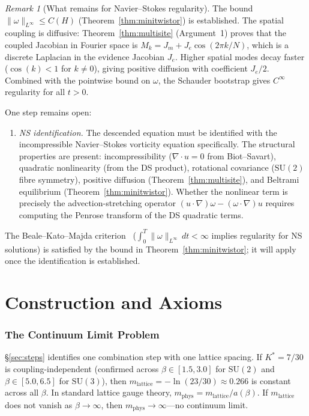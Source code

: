 \documentclass[11pt,a4paper]{article}
\theoremstyle{definition}
\theoremstyle{remark}
\newtheorem{remark}[theorem]{Remark}
\newcommand{\SU}{\mathrm{SU}}
\begin{document}
\begin{remark}[What remains for Navier--Stokes regularity]\label{rem:ns_gap}
The bound $\|\omega\|_{L^\infty}\leq C(H)$ (Theorem~\ref{thm:minitwistor}) is established. The spatial coupling is diffusive: Theorem~\ref{thm:multisite} (Argument~1) proves that the coupled Jacobian in Fourier space is $M_k=J_m+J_e\cos(2\pi k/N)$, which is a discrete Laplacian in the evidence Jacobian $J_e$. Higher spatial modes decay faster ($\cos(k)<1$ for $k\neq 0$), giving positive diffusion with coefficient $J_e/2$. Combined with the pointwise bound on $\omega$, the Schauder bootstrap gives $C^\infty$ regularity for all $t>0$.

One step remains open:
\begin{enumerate}
\item \emph{NS identification.} The descended equation must be identified with the incompressible Navier--Stokes vorticity equation specifically. The structural properties are present: incompressibility ($\nabla\cdot u=0$ from Biot--Savart), quadratic nonlinearity (from the DS product), rotational covariance ($\SU(2)$ fibre symmetry), positive diffusion (Theorem~\ref{thm:multisite}), and Beltrami equilibrium (Theorem~\ref{thm:minitwistor}). Whether the nonlinear term is precisely the advection-stretching operator $(u\cdot\nabla)\omega-(\omega\cdot\nabla)u$ requires computing the Penrose transform of the DS quadratic terms.
\end{enumerate}
The Beale--Kato--Majda criterion~\cite{BKM1984} ($\int_0^T\|\omega\|_{L^\infty}\,dt<\infty$ implies regularity for NS solutions) is satisfied by the bound in Theorem~\ref{thm:minitwistor}; it will apply once the identification is established.
\end{remark}


\part{Construction and Axioms}\label{part:D}

\section{The Continuum Limit Problem}\label{sec:continuum}

\S\ref{sec:steps} identifies one combination step with one lattice spacing. If $K^*=7/30$ is coupling-independent (confirmed across $\beta\in[1.5,3.0]$ for $\SU(2)$ and $\beta\in[5.0,6.5]$ for $\SU(3)$), then $m_{\mathrm{lattice}}=-\ln(23/30)\approx 0.266$ is constant across all $\beta$. In standard lattice gauge theory, $m_{\mathrm{phys}}=m_{\mathrm{lattice}}/a(\beta)$. If $m_{\mathrm{lattice}}$ does not vanish as $\beta\to\infty$, then $m_{\mathrm{phys}}\to\infty$---no continuum limit.
\end{document}

